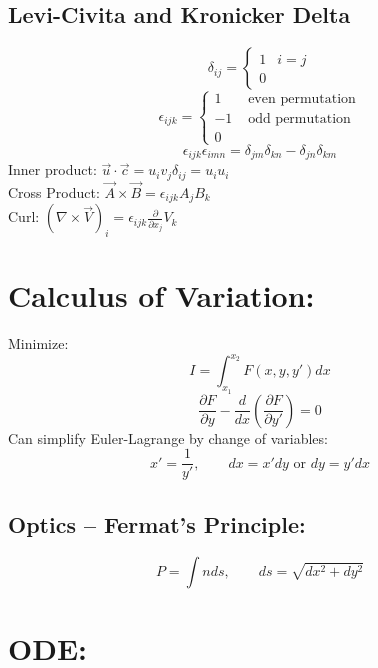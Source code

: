 \documentclass[a4paper,norsk, 10pt]{article}
\begin{document}
\subsection{Levi-Civita and Kronicker Delta}
\begin{equation}
\delta_{ij} = 
\begin{cases}
1 & i = j\\
0
\end{cases}
\end{equation}
\begin{equation}
\epsilon_{ijk} = 
\begin{cases}
1 & \text{ even permutation}\\
-1 & \text{ odd permutation}\\
0
\end{cases}
\end{equation}
\begin{equation}
\epsilon_{ijk}\epsilon_{imn} = \delta_{jm}\delta_{kn} - \delta_{jn}\delta_{km}
\end{equation}
Inner product: $\vec{u}\cdot\vec{c} = u_iv_j\delta_{ij} = u_iu_i$\\
Cross Product: $\vec{A}\times\vec{B} = \epsilon_{ijk}A_jB_k$\\
Curl: $(\nabla\times\vec{V})_i = \epsilon_{ijk}\frac{\partial}{\partial x_j}V_k$
\section{Calculus of Variation:}
Minimize:
\begin{equation}
I = \int_{x_1}^{x_2}F(x,y,y') dx
\end{equation}
\begin{equation}
\frac{\partial F}{\partial y} - \frac{d}{dx}\left(\frac{\partial F}{\partial y'}\right) = 0
\end{equation}
Can simplify Euler-Lagrange by change of variables:
\begin{equation}
x' = \frac{1}{y'}, \qquad dx = x'dy \text{ or } dy = y'dx
\end{equation}
\subsection{Optics -- Fermat's Principle:}
\begin{equation}
P = \int n ds, \qquad ds = \sqrt{dx^2 + dy^2}
\end{equation}

\section{ODE:}
\end{document}
